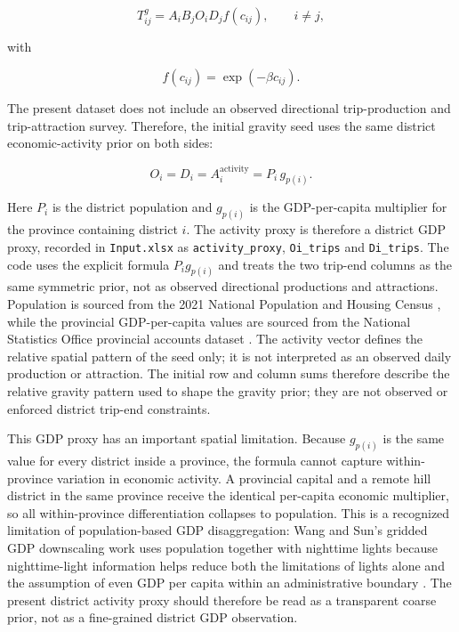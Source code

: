 \documentclass[11pt,a4paper]{article}
\begin{document}
\begin{equation}
T^{g}_{ij}=A_iB_jO_iD_jf(c_{ij}), \qquad i\neq j,
\label{eq:gravity}
\end{equation}

with

\begin{equation}
f(c_{ij})=\exp(-\beta c_{ij}).
\label{eq:friction}
\end{equation}

The present dataset does not include an observed directional trip-production
and trip-attraction survey. Therefore, the initial gravity seed uses the same
district economic-activity prior on both sides:

\begin{equation}
O_i = D_i = A_i^{\text{activity}} = P_i\,g_{p(i)} .
\end{equation}

Here $P_i$ is the district population and $g_{p(i)}$ is the GDP-per-capita
multiplier for the province containing district $i$. The activity proxy is
therefore a district GDP proxy, recorded in \texttt{Input.xlsx} as
\texttt{activity\_proxy}, \texttt{Oi\_trips} and \texttt{Di\_trips}. The code
uses the explicit formula $P_i g_{p(i)}$ and treats the two trip-end columns as
the same symmetric prior, not as observed directional productions and
attractions. Population is sourced from the 2021 National Population and
Housing Census \cite{nso2021}, while the provincial GDP-per-capita values are
sourced from the National Statistics Office provincial accounts dataset
\cite{nso_gdppc}. The activity vector defines the relative spatial pattern of
the seed only; it is not interpreted as an observed daily production or
attraction. The initial row and column sums therefore describe the relative
gravity pattern used to shape the gravity prior; they are not observed or
enforced district trip-end constraints.

This GDP proxy has an important spatial limitation. Because $g_{p(i)}$ is the
same value for every district inside a province, the formula cannot capture
within-province variation in economic activity. A provincial capital and a
remote hill district in the same province receive the identical per-capita
economic multiplier, so all within-province differentiation collapses to
population. This is a recognized limitation of population-based GDP
disaggregation: Wang and Sun's gridded GDP downscaling work uses population
together with nighttime lights because nighttime-light information helps
reduce both the limitations of lights alone and the assumption of even GDP per
capita within an administrative boundary \cite{wangsun2022}. The present
district activity proxy should therefore be read as a transparent coarse prior,
not as a fine-grained district GDP observation.
\end{document}
